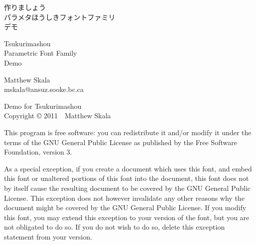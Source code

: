 \documentclass[14pt]{extarticle}
\begin{document}
\pagestyle{plain}\thispagestyle{empty}


\kaku
\begin{center}\LARGE

\vspace*{\fill}

{\Huge 作りましょう~\TsukurimashouVWide}\\
{\huge パラメタほうしきフォントファミリ\\
デモ}

\vspace*{0.75in}

{\Huge Tsukurimashou~\TsukurimashouVersion}\\
{\huge Parametric Font Family\\
Demo}

\vspace*{1.5in}

Matthew Skala\\
mskala@ansuz.sooke.bc.ca\\
\TsukurimashouRDWide\qquad\TsukurimashouReleaseDate

\vspace*{\fill}

\end{center}
\clearpage


\vspace*{\fill}

Demo for Tsukurimashou\\
Copyright © 2011~~Matthew Skala

This program is free software: you can redistribute it and/or modify
it under the terms of the GNU General Public License as published by
the Free Software Foundation, version 3.

As a special exception, if you create a document which uses this font, and
embed this font or unaltered portions of this font into the document, this
font does not by itself cause the resulting document to be covered by the
GNU General Public License. This exception does not however invalidate any
other reasons why the document might be covered by the GNU General Public
License. If you modify this font, you may extend this exception to your
version of the font, but you are not obligated to do so. If you do not
wish to do so, delete this exception statement from your version.
\end{document}
